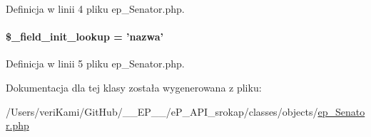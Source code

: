 Definicja w linii 4 pliku ep\-\_\-\-Senator.\-php.

\hypertarget{classep___senator_a4a4d54ae35428077a7c61ec8a5139af3}{
\paragraph[{\$\-\_\-field\-\_\-init\-\_\-lookup}]{\setlength{\rightskip}{0pt plus 5cm}\$\-\_\-field\-\_\-init\-\_\-lookup = 'nazwa'}}\label{classep___senator_a4a4d54ae35428077a7c61ec8a5139af3}


Definicja w linii 5 pliku ep\-\_\-\-Senator.\-php.



Dokumentacja dla tej klasy została wygenerowana z pliku\-:\begin{DoxyCompactItemize}
\item 
/\-Users/veri\-Kami/\-Git\-Hub/\-\_\-\-\_\-\-E\-P\-\_\-\-\_\-/e\-P\-\_\-\-A\-P\-I\-\_\-srokap/classes/objects/\hyperlink{ep___senator_8php}{ep\-\_\-\-Senator.\-php}\end{DoxyCompactItemize}
